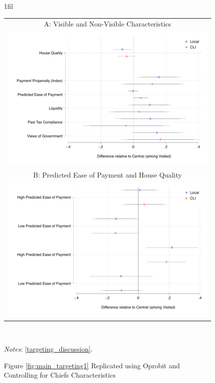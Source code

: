 \documentclass[12pt,english]{article}
\makeatletter
\renewcommand{\footnotesize}{\fontsize{9pt}{11pt}\selectfont}\usepackage[unicode=true,
\newcommand*{\centerfloat}{%
  \parindent \z@
  \leftskip \z@ \@plus 1fil \@minus \textwidth
  \rightskip\leftskip
  \parfillskip \z@skip}
\makeatother
\begin{document}
\begin{figure}[H]
	\centering{}\caption*{
		\label{fig:main_targeting1_R2} Figure \ref{fig:main_targeting1} Replicated using Oprobit and Controlling for Chiefs Characteristics}
	\centering
	\centerfloat
	\begin{tabular}{c}
		A: Visible and Non-Visible Characteristics\\
		\includegraphics[scale=.62]{Output/chars_visited_R2.pdf}\\
		B: Predicted Ease of Payment and House Quality\\
		\includegraphics[scale=.8]{Output/chars_PEXHQ_R2.pdf}\\
	\end{tabular}
	\usebox{\tablebox}\\[1ex]
	\parbox{6in}{\footnotesize \textit{Notes}:  \ref{targeting_discussion}.}
\end{figure}
\end{document}
